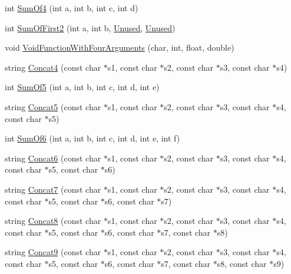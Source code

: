 \begin{DoxyCompactItemize}
\item 
int \hyperlink{namespacetesting_1_1gmock__more__actions__test_a41c348fff8608825239a276b8426a475}{Sum\+Of4} (int a, int b, int c, int d)
\item 
int \hyperlink{namespacetesting_1_1gmock__more__actions__test_aaa60ddffb96ddc3a73b0b22929ca5bec}{Sum\+Of\+First2} (int a, int b, \hyperlink{namespacetesting_a603e329ec0263ebfcf16f712810bd511}{Unused}, \hyperlink{namespacetesting_a603e329ec0263ebfcf16f712810bd511}{Unused})
\item 
void \hyperlink{namespacetesting_1_1gmock__more__actions__test_a8c952be61635486e84c1eca3bf3acd9b}{Void\+Function\+With\+Four\+Arguments} (char, int, float, double)
\item 
string \hyperlink{namespacetesting_1_1gmock__more__actions__test_aa423cedcbd858249b616f0c537a1e4cf}{Concat4} (const char $\ast$s1, const char $\ast$s2, const char $\ast$s3, const char $\ast$s4)
\item 
int \hyperlink{namespacetesting_1_1gmock__more__actions__test_a38e64569bf08e83c6db22c1fb0fe0af6}{Sum\+Of5} (int a, int b, int c, int d, int e)
\item 
string \hyperlink{namespacetesting_1_1gmock__more__actions__test_a2ac9917d1aa19cd7ac32bba837f4eacc}{Concat5} (const char $\ast$s1, const char $\ast$s2, const char $\ast$s3, const char $\ast$s4, const char $\ast$s5)
\item 
int \hyperlink{namespacetesting_1_1gmock__more__actions__test_a139632d344348fdfa25111d4e43f70ba}{Sum\+Of6} (int a, int b, int c, int d, int e, int f)
\item 
string \hyperlink{namespacetesting_1_1gmock__more__actions__test_a4de188277a85d007de0aa6e8dc364b75}{Concat6} (const char $\ast$s1, const char $\ast$s2, const char $\ast$s3, const char $\ast$s4, const char $\ast$s5, const char $\ast$s6)
\item 
string \hyperlink{namespacetesting_1_1gmock__more__actions__test_a5628f71ebb5ae61a6e56396145a76da4}{Concat7} (const char $\ast$s1, const char $\ast$s2, const char $\ast$s3, const char $\ast$s4, const char $\ast$s5, const char $\ast$s6, const char $\ast$s7)
\item 
string \hyperlink{namespacetesting_1_1gmock__more__actions__test_a122e4affe78745eef3dd748e88bd248c}{Concat8} (const char $\ast$s1, const char $\ast$s2, const char $\ast$s3, const char $\ast$s4, const char $\ast$s5, const char $\ast$s6, const char $\ast$s7, const char $\ast$s8)
\item 
string \hyperlink{namespacetesting_1_1gmock__more__actions__test_a9f8c8c01bc080a04d798060dad757cf9}{Concat9} (const char $\ast$s1, const char $\ast$s2, const char $\ast$s3, const char $\ast$s4, const char $\ast$s5, const char $\ast$s6, const char $\ast$s7, const char $\ast$s8, const char $\ast$s9)

\end{DoxyCompactItemize}
